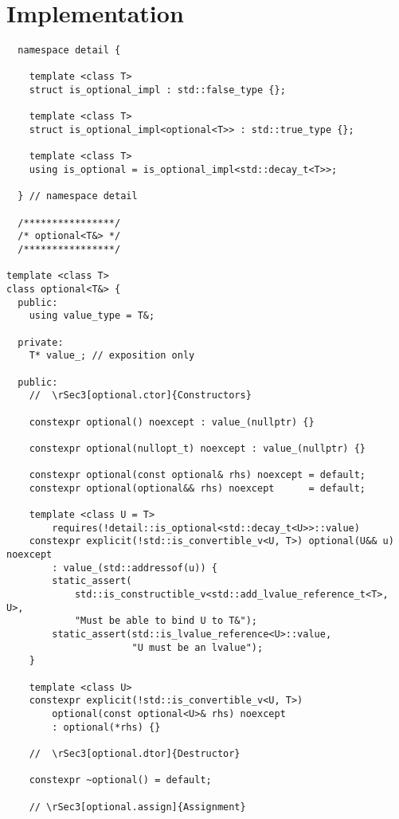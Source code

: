 \documentclass[a4paper,10pt,oneside,openany,final,article]{memoir}
\begin{document}
\renewcommand{\bibname}{References}



\backmatter
\chapter*{Implementation}

\begin{verbatim}
  namespace detail {

    template <class T>
    struct is_optional_impl : std::false_type {};

    template <class T>
    struct is_optional_impl<optional<T>> : std::true_type {};

    template <class T>
    using is_optional = is_optional_impl<std::decay_t<T>>;

  } // namespace detail

  /****************/
  /* optional<T&> */
  /****************/

template <class T>
class optional<T&> {
  public:
    using value_type = T&;

  private:
    T* value_; // exposition only

  public:
    //  \rSec3[optional.ctor]{Constructors}

    constexpr optional() noexcept : value_(nullptr) {}

    constexpr optional(nullopt_t) noexcept : value_(nullptr) {}

    constexpr optional(const optional& rhs) noexcept = default;
    constexpr optional(optional&& rhs) noexcept      = default;

    template <class U = T>
        requires(!detail::is_optional<std::decay_t<U>>::value)
    constexpr explicit(!std::is_convertible_v<U, T>) optional(U&& u) noexcept
        : value_(std::addressof(u)) {
        static_assert(
            std::is_constructible_v<std::add_lvalue_reference_t<T>, U>,
            "Must be able to bind U to T&");
        static_assert(std::is_lvalue_reference<U>::value,
                      "U must be an lvalue");
    }

    template <class U>
    constexpr explicit(!std::is_convertible_v<U, T>)
        optional(const optional<U>& rhs) noexcept
        : optional(*rhs) {}

    //  \rSec3[optional.dtor]{Destructor}

    constexpr ~optional() = default;

    // \rSec3[optional.assign]{Assignment}


\end{verbatim}
\end{document}
